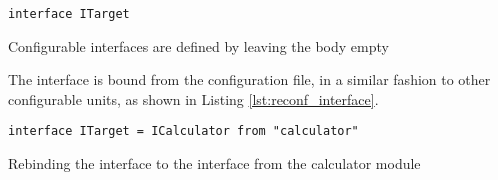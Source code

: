 \begin{listing}[H]
\begin{verbatim}
interface ITarget
\end{verbatim}
\caption{Configurable interfaces are defined by leaving the body empty}
\label{lst:ext_interfaces}
\end{listing}

The interface is bound from the configuration file, in a similar fashion to
other configurable units, as shown in Listing \ref{lst:reconf_interface}.

\begin{listing}[H]
\begin{verbatim}
interface ITarget = ICalculator from "calculator"
\end{verbatim}

\caption{Rebinding the  interface to the 
    interface from the calculator module}

\label{lst:reconf_interface}
\end{listing}

